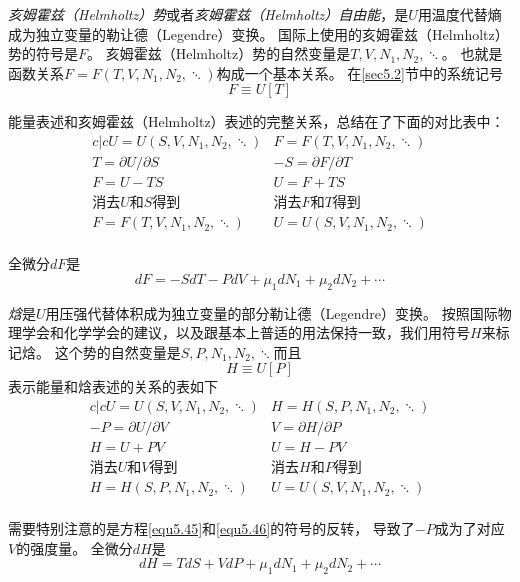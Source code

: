 {\it 亥姆霍兹（Helmholtz）势}或者{\it 亥姆霍兹（Helmholtz）自由能}，是$U$用温度代替熵成为独立变量的勒让德（Legendre）变换。
国际上使用的亥姆霍兹（Helmholtz）势的符号是$F$。
亥姆霍兹（Helmholtz）势的自然变量是$T,V,N_1,N_2,\ddots$。
也就是函数关系$F=F(T,V,N_1,N_2,\ddots)$构成一个基本关系。
在\ref{sec5.2}节中的系统记号
\begin{equation}
\label{equ5.38}
  F\equiv U[T]
\end{equation}

能量表述和亥姆霍兹（Helmholtz）表述的完整关系，总结在了下面的对比表中：
\begin{eqnarray}{c|c}
U=U(S,V,N_1,N_2,\ddots) & F=F(T,V,N_1,N_2,\ddots)\label{equ5.39}\\
T=\partial U/\partial S & -S=\partial F/\partial T\label{equ5.40} \\
F=U-TS & U=F+TS \label{equ5.41} \\
\text{消去$U$和$S$得到} & \text{消去$F$和$T$得到}\nonumber\\
F=F(T,V,N_1,N_2,\ddots) & U=U(S,V,N_1,N_2,\ddots)\nonumber\\
\end{eqnarray}

全微分$dF$是
\begin{equation}
\label{equ5.42}
  dF=-SdT-PdV+\mu_1dN_1+\mu_2dN_2+\cdots
\end{equation}

{\it 焓}是$U$用压强代替体积成为独立变量的部分勒让德（Legendre）变换。
按照国际物理学会和化学学会的建议，以及跟基本上普适的用法保持一致，我们用符号$H$来标记焓。
这个势的自然变量是$S,P,N_1,N_2,\ddots$而且
\begin{equation}
\label{equ5.43}
  H\equiv U[P]
\end{equation}
表示能量和焓表述的关系的表如下
\begin{eqnarray}{c|c}
U=U(S,V,N_1,N_2,\ddots) & H=H(S,P,N_1,N_2,\ddots)\label{equ5.44}\\
-P=\partial U/\partial V & V=\partial H/\partial P\label{equ5.45} \\
H=U+PV & U=H-PV \label{equ5.46} \\
\text{消去$U$和$V$得到} & \text{消去$H$和$P$得到}\nonumber\\
H=H(S,P,N_1,N_2,\ddots) & U=U(S,V,N_1,N_2,\ddots)\nonumber\\
\end{eqnarray}

需要特别注意的是方程\eqref{equ5.45}和\eqref{equ5.46}的符号的反转，
导致了$-P$成为了对应$V$的强度量。
全微分$dH$是
\begin{equation}
\label{equ5.47}
  dH=TdS+VdP+\mu_1dN_1+\mu_2dN_2+\cdots
\end{equation}

